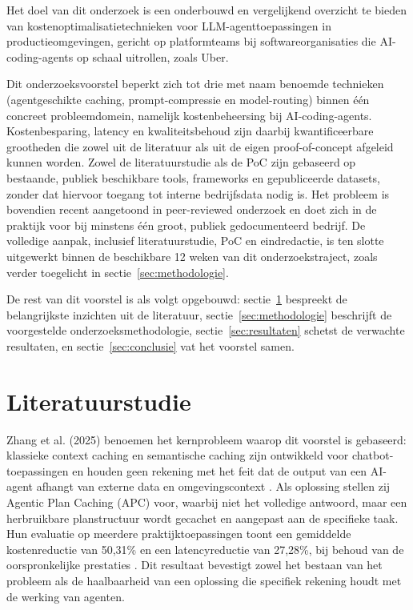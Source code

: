 \documentclass{hogent-article}
\begin{document}
Het doel van dit onderzoek is een onderbouwd en vergelijkend overzicht te bieden van kostenoptimalisatietechnieken voor LLM-agenttoepassingen in productieomgevingen, gericht op platformteams bij softwareorganisaties die AI-coding-agents op schaal uitrollen, zoals Uber.

Dit onderzoeksvoorstel beperkt zich tot drie met naam benoemde technieken (agentgeschikte caching, prompt-compressie en model-routing) binnen één concreet probleemdomein, namelijk kostenbeheersing bij AI-coding-agents. Kostenbesparing, latency en kwaliteitsbehoud zijn daarbij kwantificeerbare grootheden die zowel uit de literatuur als uit de eigen proof-of-concept afgeleid kunnen worden. Zowel de literatuurstudie als de PoC zijn gebaseerd op bestaande, publiek beschikbare tools, frameworks en gepubliceerde datasets, zonder dat hiervoor toegang tot interne bedrijfsdata nodig is. Het probleem is bovendien recent aangetoond in peer-reviewed onderzoek en doet zich in de praktijk voor bij minstens één groot, publiek gedocumenteerd bedrijf. De volledige aanpak, inclusief literatuurstudie, PoC en eindredactie, is ten slotte uitgewerkt binnen de beschikbare 12 weken van dit onderzoekstraject, zoals verder toegelicht in sectie~\ref{sec:methodologie}.

De rest van dit voorstel is als volgt opgebouwd: sectie~\ref{sec:literatuurstudie} bespreekt de belangrijkste inzichten uit de literatuur, sectie~\ref{sec:methodologie} beschrijft de voorgestelde onderzoeksmethodologie, sectie~\ref{sec:resultaten} schetst de verwachte resultaten, en sectie~\ref{sec:conclusie} vat het voorstel samen.

\section{Literatuurstudie}%
\label{sec:literatuurstudie}

Zhang et al. (2025) benoemen het kernprobleem waarop dit voorstel is gebaseerd: klassieke context caching en semantische caching zijn ontwikkeld voor chatbot-toepassingen en houden geen rekening met het feit dat de output van een AI-agent afhangt van externe data en omgevingscontext \autocite{Zhang2025}. Als oplossing stellen zij Agentic Plan Caching (APC) voor, waarbij niet het volledige antwoord, maar een herbruikbare planstructuur wordt gecachet en aangepast aan de specifieke taak. Hun evaluatie op meerdere praktijktoepassingen toont een gemiddelde kostenreductie van 50,31\% en een latencyreductie van 27,28\%, bij behoud van de oorspronkelijke prestaties \autocite{Zhang2025}. Dit resultaat bevestigt zowel het bestaan van het probleem als de haalbaarheid van een oplossing die specifiek rekening houdt met de werking van agenten.
\end{document}
